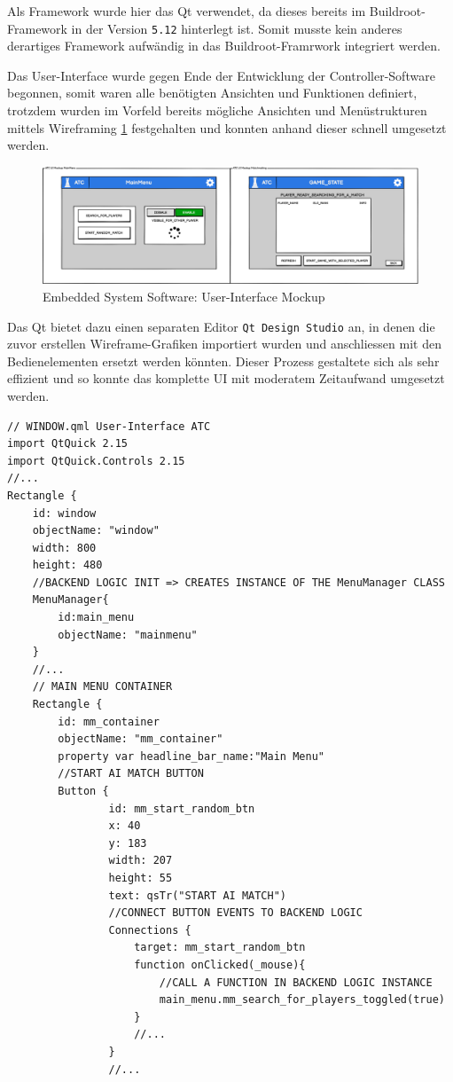 Als Framework wurde hier das Qt\cite{qtframework} verwendet, da
dieses bereits im Buildroot-Framework in der Version
\passthrough{\lstinline!5.12!} hinterlegt ist. Somit musste kein anderes
derartiges Framework aufwändig in das Buildroot-Framrwork integriert
werden.

Das User-Interface wurde gegen Ende der Entwicklung der
Controller-Software begonnen, somit waren alle benötigten Ansichten und
Funktionen definiert, trotzdem wurden im Vorfeld bereits mögliche
Ansichten und Menüstrukturen mittels Wireframing \ref{ATC_Gui}
festgehalten und konnten anhand dieser schnell umgesetzt werden.

\begin{figure}
\centering
\includegraphics{images/ATC_Gui.png}
\caption{Embedded System Software: User-Interface Mockup
\label{ATC_Gui}}
\end{figure}

Das Qt\cite{qtframework} bietet dazu einen separaten Editor
\passthrough{\lstinline!Qt Design Studio!} an, in denen die zuvor
erstellen Wireframe-Grafiken importiert wurden und anschliessen mit den
Bedienelementen ersetzt werden könnten. Dieser Prozess gestaltete sich
als sehr effizient und so konnte das komplette UI mit moderatem
Zeitaufwand umgesetzt werden.

\begin{lstlisting}
// WINDOW.qml User-Interface ATC
import QtQuick 2.15
import QtQuick.Controls 2.15
//...
Rectangle {
    id: window
    objectName: "window"
    width: 800
    height: 480
    //BACKEND LOGIC INIT => CREATES INSTANCE OF THE MenuManager CLASS
    MenuManager{
        id:main_menu
        objectName: "mainmenu"
    }
    //...
    // MAIN MENU CONTAINER
    Rectangle {
        id: mm_container
        objectName: "mm_container"
        property var headline_bar_name:"Main Menu"
        //START AI MATCH BUTTON
        Button {
                id: mm_start_random_btn
                x: 40
                y: 183
                width: 207
                height: 55
                text: qsTr("START AI MATCH")
                //CONNECT BUTTON EVENTS TO BACKEND LOGIC
                Connections {
                    target: mm_start_random_btn
                    function onClicked(_mouse){
                        //CALL A FUNCTION IN BACKEND LOGIC INSTANCE
                        main_menu.mm_search_for_players_toggled(true)
                    }
                    //...
                }
                //...
\end{lstlisting}

